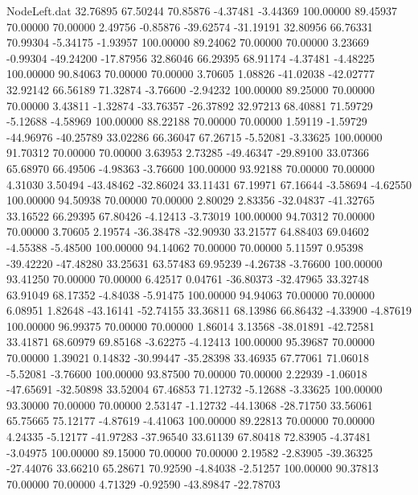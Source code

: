 \begin{filecontents}{NodeLeft.dat}
  32.76895   67.50244   70.85876    -4.37481   -3.44369  100.00000   89.45937   70.00000   70.00000    2.49756   -0.85876  -39.62574  -31.19191
  32.80956   66.76331   70.99304    -5.34175   -1.93957  100.00000   89.24062   70.00000   70.00000    3.23669   -0.99304  -49.24200  -17.87956
  32.86046   66.29395   68.91174    -4.37481   -4.48225  100.00000   90.84063   70.00000   70.00000    3.70605    1.08826  -41.02038  -42.02777
  32.92142   66.56189   71.32874    -3.76600   -2.94232  100.00000   89.25000   70.00000   70.00000    3.43811   -1.32874  -33.76357  -26.37892
  32.97213   68.40881   71.59729    -5.12688   -4.58969  100.00000   88.22188   70.00000   70.00000    1.59119   -1.59729  -44.96976  -40.25789
  33.02286   66.36047   67.26715    -5.52081   -3.33625  100.00000   91.70312   70.00000   70.00000    3.63953    2.73285  -49.46347  -29.89100
  33.07366   65.68970   66.49506    -4.98363   -3.76600  100.00000   93.92188   70.00000   70.00000    4.31030    3.50494  -43.48462  -32.86024
  33.11431   67.19971   67.16644    -3.58694   -4.62550  100.00000   94.50938   70.00000   70.00000    2.80029    2.83356  -32.04837  -41.32765
  33.16522   66.29395   67.80426    -4.12413   -3.73019  100.00000   94.70312   70.00000   70.00000    3.70605    2.19574  -36.38478  -32.90930
  33.21577   64.88403   69.04602    -4.55388   -5.48500  100.00000   94.14062   70.00000   70.00000    5.11597    0.95398  -39.42220  -47.48280
  33.25631   63.57483   69.95239    -4.26738   -3.76600  100.00000   93.41250   70.00000   70.00000    6.42517    0.04761  -36.80373  -32.47965
  33.32748   63.91049   68.17352    -4.84038   -5.91475  100.00000   94.94063   70.00000   70.00000    6.08951    1.82648  -43.16141  -52.74155
  33.36811   68.13986   66.86432    -4.33900   -4.87619  100.00000   96.99375   70.00000   70.00000    1.86014    3.13568  -38.01891  -42.72581
  33.41871   68.60979   69.85168    -3.62275   -4.12413  100.00000   95.39687   70.00000   70.00000    1.39021    0.14832  -30.99447  -35.28398
  33.46935   67.77061   71.06018    -5.52081   -3.76600  100.00000   93.87500   70.00000   70.00000    2.22939   -1.06018  -47.65691  -32.50898
  33.52004   67.46853   71.12732    -5.12688   -3.33625  100.00000   93.30000   70.00000   70.00000    2.53147   -1.12732  -44.13068  -28.71750
  33.56061   65.75665   75.12177    -4.87619   -4.41063  100.00000   89.22813   70.00000   70.00000    4.24335   -5.12177  -41.97283  -37.96540
  33.61139   67.80418   72.83905    -4.37481   -3.04975  100.00000   89.15000   70.00000   70.00000    2.19582   -2.83905  -39.36325  -27.44076
  33.66210   65.28671   70.92590    -4.84038   -2.51257  100.00000   90.37813   70.00000   70.00000    4.71329   -0.92590  -43.89847  -22.78703

\end{filecontents}
